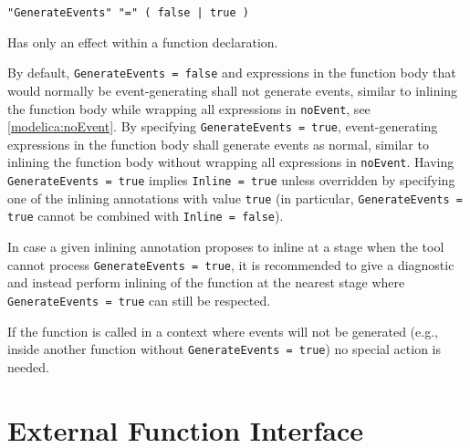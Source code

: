\begin{annotationdefinition}[GenerateEvents]
\begin{synopsis}[grammar]\begin{lstlisting}
"GenerateEvents" "=" ( false | true )
\end{lstlisting}\end{synopsis}
\begin{semantics}
Has only an effect within a function declaration.

By default, {\lstinline!GenerateEvents = false!} and expressions in the function body that would normally be event-generating shall not generate events, similar to inlining the function body while wrapping all expressions in {\lstinline!noEvent!}, see \cref{modelica:noEvent}.
By specifying {\lstinline!GenerateEvents = true!}, event-generating expressions in the function body shall generate events as normal, similar to inlining the function body without wrapping all expressions in {\lstinline!noEvent!}.
Having {\lstinline!GenerateEvents = true!} implies {\lstinline!Inline = true!} unless overridden by specifying one of the inlining annotations with value {\lstinline!true!} (in particular, {\lstinline!GenerateEvents = true!} cannot be combined with {\lstinline!Inline = false!}).

\begin{nonnormative}
In case a given inlining annotation proposes to inline at a stage when the tool cannot process {\lstinline!GenerateEvents = true!}, it is recommended to give a diagnostic and instead perform inlining of the function at the nearest stage where {\lstinline!GenerateEvents = true!} can still be respected.

If the function is called in a context where events will not be generated (e.g., inside another function without {\lstinline!GenerateEvents = true!}) no special action is needed.
\end{nonnormative}
\end{semantics}
\end{annotationdefinition}


\section{External Function Interface}\label{external-function-interface}

